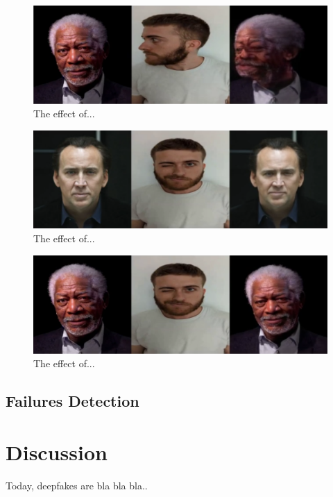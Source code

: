 \documentclass[english,12pt]{article}
\begin{document}
\begin{figure}[htb]
  \begin{centering}
      \includegraphics[scale=0.29]{images/Oren_tilt_freeman.PNG}
  \par\end{centering}
  \caption{\label{fig:Oren_tilt_freeman}The effect of...}
\end{figure}

\begin{figure}[htb]
  \begin{centering}
      \includegraphics[scale=0.29]{images/Oren_wink_cage.PNG}
  \par\end{centering}
  \caption{\label{fig:Oren_wink_cage}The effect of...}
\end{figure}

\begin{figure}[htb]
  \begin{centering}
      \includegraphics[scale=0.29]{images/Oren_wink_freeman.PNG}
  \par\end{centering}
  \caption{\label{fig:Oren_wink_freeman}The effect of...}
\end{figure}

\subsection{Failures Detection}



\section{Discussion} \label{discussion}

Today, deepfakes are bla bla bla..

\pagebreak{}




\end{document}
